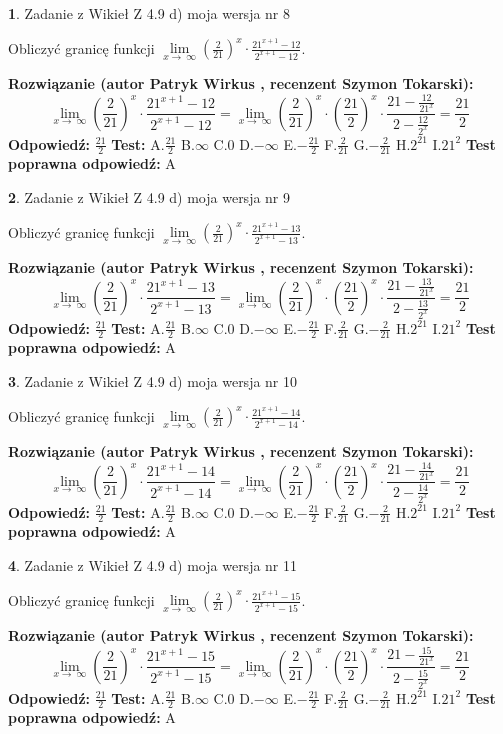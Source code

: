 \documentclass[12pt, a4paper]{article}
\theoremstyle{definition} %
\newtheorem{zad}{}
\newcommand{\zadStart}[1]{\begin{zad}#1\newline}
\newcommand{\zadStop}{\end{zad}}
\newcommand{\rozwStart}[2]{\noindent \textbf{Rozwiązanie (autor #1 , recenzent #2): }\newline}
\newcommand{\rozwStop}{\newline}
\newcommand{\odpStart}{\noindent \textbf{Odpowiedź:}\newline}
\newcommand{\odpStop}{\newline}
\newcommand{\testStart}{\noindent \textbf{Test:}\newline}
\newcommand{\testStop}{\newline}
\newcommand{\kluczStart}{\noindent \textbf{Test poprawna odpowiedź:}\newline}
\newcommand{\kluczStop}{\newline}
\begin{document}
\zadStart{Zadanie z Wikieł Z 4.9 d) moja wersja nr 8}


Obliczyć granicę funkcji  $\lim\limits_{x\to\ \infty}(\frac{2}{21})^{x}\cdot\frac{21^{x+1}-12}{2^{x+1}-12}$.
\zadStop
\rozwStart{Patryk Wirkus}{Szymon Tokarski}
$$\lim\limits_{x\to\ \infty}(\frac{2}{21})^{x}\cdot\frac{21^{x+1}-12}{2^{x+1}-12}=\lim\limits_{x\to\ \infty}(\frac{2}{21})^{x}\cdot(\frac{21}{2})^{x} \cdot \frac{21-\frac{12}{21^{x}}}{2-\frac{12}{2^{x}}} = \frac{21}{2}$$
\rozwStop
\odpStart
$\frac{21}{2}$
\odpStop
\testStart
A.$\frac{21}{2}$ B.$\infty$ C.$0$ D.$-\infty$ E.$-\frac{21}{2}$
F.$\frac{2}{21}$ G.$-\frac{2}{21}$
H.$2^{21}$
I.$21^{2}$
\testStop
\kluczStart
A
\kluczStop



\zadStart{Zadanie z Wikieł Z 4.9 d) moja wersja nr 9}


Obliczyć granicę funkcji  $\lim\limits_{x\to\ \infty}(\frac{2}{21})^{x}\cdot\frac{21^{x+1}-13}{2^{x+1}-13}$.
\zadStop
\rozwStart{Patryk Wirkus}{Szymon Tokarski}
$$\lim\limits_{x\to\ \infty}(\frac{2}{21})^{x}\cdot\frac{21^{x+1}-13}{2^{x+1}-13}=\lim\limits_{x\to\ \infty}(\frac{2}{21})^{x}\cdot(\frac{21}{2})^{x} \cdot \frac{21-\frac{13}{21^{x}}}{2-\frac{13}{2^{x}}} = \frac{21}{2}$$
\rozwStop
\odpStart
$\frac{21}{2}$
\odpStop
\testStart
A.$\frac{21}{2}$ B.$\infty$ C.$0$ D.$-\infty$ E.$-\frac{21}{2}$
F.$\frac{2}{21}$ G.$-\frac{2}{21}$
H.$2^{21}$
I.$21^{2}$
\testStop
\kluczStart
A
\kluczStop



\zadStart{Zadanie z Wikieł Z 4.9 d) moja wersja nr 10}


Obliczyć granicę funkcji  $\lim\limits_{x\to\ \infty}(\frac{2}{21})^{x}\cdot\frac{21^{x+1}-14}{2^{x+1}-14}$.
\zadStop
\rozwStart{Patryk Wirkus}{Szymon Tokarski}
$$\lim\limits_{x\to\ \infty}(\frac{2}{21})^{x}\cdot\frac{21^{x+1}-14}{2^{x+1}-14}=\lim\limits_{x\to\ \infty}(\frac{2}{21})^{x}\cdot(\frac{21}{2})^{x} \cdot \frac{21-\frac{14}{21^{x}}}{2-\frac{14}{2^{x}}} = \frac{21}{2}$$
\rozwStop
\odpStart
$\frac{21}{2}$
\odpStop
\testStart
A.$\frac{21}{2}$ B.$\infty$ C.$0$ D.$-\infty$ E.$-\frac{21}{2}$
F.$\frac{2}{21}$ G.$-\frac{2}{21}$
H.$2^{21}$
I.$21^{2}$
\testStop
\kluczStart
A
\kluczStop



\zadStart{Zadanie z Wikieł Z 4.9 d) moja wersja nr 11}


Obliczyć granicę funkcji  $\lim\limits_{x\to\ \infty}(\frac{2}{21})^{x}\cdot\frac{21^{x+1}-15}{2^{x+1}-15}$.
\zadStop
\rozwStart{Patryk Wirkus}{Szymon Tokarski}
$$\lim\limits_{x\to\ \infty}(\frac{2}{21})^{x}\cdot\frac{21^{x+1}-15}{2^{x+1}-15}=\lim\limits_{x\to\ \infty}(\frac{2}{21})^{x}\cdot(\frac{21}{2})^{x} \cdot \frac{21-\frac{15}{21^{x}}}{2-\frac{15}{2^{x}}} = \frac{21}{2}$$
\rozwStop
\odpStart
$\frac{21}{2}$
\odpStop
\testStart
A.$\frac{21}{2}$ B.$\infty$ C.$0$ D.$-\infty$ E.$-\frac{21}{2}$
F.$\frac{2}{21}$ G.$-\frac{2}{21}$
H.$2^{21}$
I.$21^{2}$
\testStop
\kluczStart
A
\kluczStop
\end{document}
